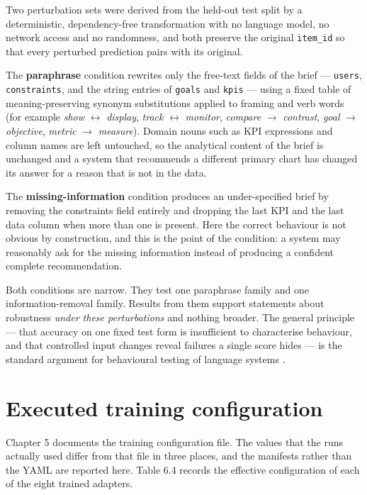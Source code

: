 Two perturbation sets were derived from the held-out test split by a deterministic, dependency-free transformation with no language model, no network access and no randomness, and both preserve the original \texttt{item\_id} so that every perturbed prediction pairs with its original.

The \textbf{paraphrase} condition rewrites only the free-text fields of the brief --- \texttt{users}, \texttt{constraints}, and the string entries of \texttt{goals} and \texttt{kpis} --- using a fixed table of meaning-preserving synonym substitutions applied to framing and verb words (for example \emph{show} \(\leftrightarrow\) \emph{display}, \emph{track} \(\leftrightarrow\) \emph{monitor}, \emph{compare} \(\rightarrow\) \emph{contrast}, \emph{goal} \(\rightarrow\) \emph{objective}, \emph{metric} \(\rightarrow\) \emph{measure}). Domain nouns such as KPI expressions and column names are left untouched, so the analytical content of the brief is unchanged and a system that recommends a different primary chart has changed its answer for a reason that is not in the data.

The \textbf{missing-information} condition produces an under-specified brief by removing the constraints field entirely and dropping the last KPI and the last data column when more than one is present. Here the correct behaviour is not obvious by construction, and this is the point of the condition: a system may reasonably ask for the missing information instead of producing a confident complete recommendation.

Both conditions are narrow. They test one paraphrase family and one information-removal family. Results from them support statements about robustness \emph{under these perturbations} and nothing broader. The general principle --- that accuracy on one fixed test form is insufficient to characterise behaviour, and that controlled input changes reveal failures a single score hides --- is the standard argument for behavioural testing of language systems \cite{ribeiro2020checklist}.

\section{Executed training configuration}

Chapter 5 documents the training configuration file. The values that the runs actually used differ from that file in three places, and the manifests rather than the YAML are reported here. Table 6.4 records the effective configuration of each of the eight trained adapters.

